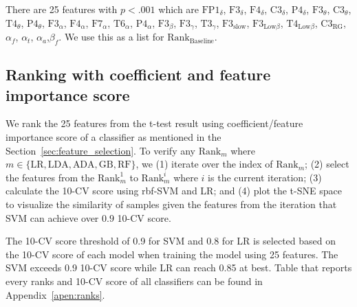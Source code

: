 \documentclass[pdflatex,sn-mathphys]{sn-jnl}%
\theoremstyle{thmstyleone}%
\theoremstyle{thmstyletwo}%
\theoremstyle{thmstylethree}%
\begin{document}
\begin{table}[h!]
\caption{Results for the t-test on asymmetries}
    \label{tab:featureselection2}
\end{table}

There are 25 features with $p < .001$ which are $\text{FP1}_{\delta}$, $\text{F3}_{\delta}$, $\text{F4}_{\delta}$, $\text{C3}_{\delta}$, $\text{P4}_{\delta}$, $\text{F3}_{\theta}$, $\text{C3}_{\theta}$, $\text{T4}_{\theta}$, $\text{P4}_{\theta}$, $\text{F3}_{\alpha}$, $\text{F4}_{\alpha}$, $\text{F7}_{\alpha}$, $\text{T6}_{\alpha}$, $\text{P4}_{\alpha}$, $\text{F3}_{\beta}$, $\text{F3}_{\gamma}$, $\text{T3}_{\gamma}$, $\text{F3}_\text{slow}$, $\text{F3}_{\text{Low}\beta}$, $\text{T4}_{\text{Low}\beta}$, $\text{C3}_{\text{RG}}$, $\alpha_{f}$, $\alpha_{t}$, $\alpha_{a}$,$\beta_{f}$. We use this as a list for $\text{Rank}_{\text{Baseline}}$.

\subsection{Ranking with coefficient and feature importance score}

We rank the 25 features from the t-test result using coefficient/feature importance score of a classifier as mentioned in the Section~\ref{sec:feature_selection}. To verify any $\text{Rank}_{m}$ where $m \in \{\text{LR}, \text{LDA}, \text{ADA}, \text{GB}, \text{RF}\}$, we (1) iterate over the index of $\text{Rank}_{m}$; (2) select the features from the $\text{Rank}_{m}^{1}$ to $\text{Rank}_{m}^{i}$ where $i$ is the current iteration; (3) calculate the 10-CV score using rbf-SVM and LR; and (4) plot the t-SNE space to visualize the similarity of samples given the features from the iteration that SVM can achieve over $0.9$ 10-CV score.

The 10-CV score threshold of 0.9 for SVM and 0.8 for LR is selected based on the 10-CV score of each model when training the model using 25 features. The SVM exceeds 0.9 10-CV score while LR can reach 0.85 at best. Table that reports every ranks and 10-CV score of all classifiers can be found in Appendix~\ref{apen:ranks}.
\end{document}

